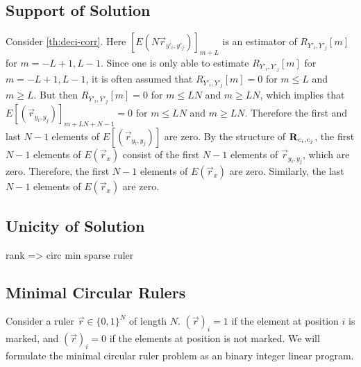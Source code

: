 \documentclass[a4paper, openany, oneside]{memoir}
\begin{document}
\subsection{Support of Solution}
Consider \cref{th:deci-corr}. Here $[E(N \vec{r}_{y'_i,y'_j})]_{m + L}$ is an estimator of $R_{Y'_i,Y'_j}[m]$ for $m = -L+1,L-1$. Since one is only able to estimate $R_{Y'_i,Y'_j}[m]$ for $m=-L+1,L-1$, it is often assumed that $R_{Y'_i,Y'_j}[m]=0$ for $m \le L$ and $m \ge L$. But then $R_{Y'_i,Y'_j}[m]=0$ for $m \le LN$ and $m \ge LN$, which implies that $E[(\vec{r}_{y_i,y_j})]_{m+LN + N-1}=0$ for $m \le LN$ and $m \ge LN$. Therefore the first and last $N-1$ elements of $E[(\vec{r}_{y_i,y_j})]$ are zero. By the structure of $\boldsymbol{\mathbf{R}}_{c_i,c_j}$, the first $N-1$ elements of $E(\vec{r}_x)$ consist of the first $N-1$ elements of $\vec{r}_{y_i,y_j}$, which are zero. Therefore, the first $N-1$ elements of $E(\vec{r}_x)$ are zero. Similarly, the last $N-1$ elements of $E(\vec{r}_x)$ are zero.

\subsection{Unicity of Solution}
rank => circ min sparse ruler

\subsection{Minimal Circular Rulers}
Consider a ruler $\vec{r} \in \{0,1\}^N$ of length $N$. $(\vec{r})_i = 1$ if the element at position $i$ is marked, and $(\vec{r})_i = 0$ if the elements at position is not marked. We will formulate the minimal circular ruler problem as an binary integer linear program.
\end{document}
